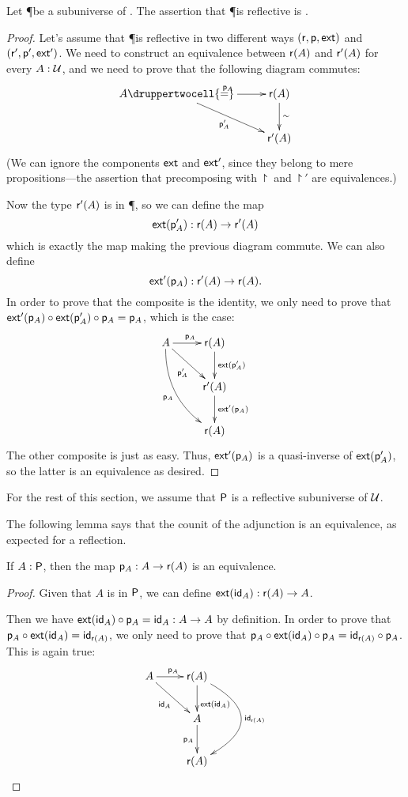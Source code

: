\begin{lem}
  Let \P be a subuniverse of \type. The assertion that \P is reflective is \anhprop.
\end{lem}

\begin{proof}
  Let's assume that \P is reflective in two different ways
  $(\reflect,\project,\ext)$ and $(\reflect',\project',\ext')$. We need to
  construct an equivalence between $\reflect(A)$ and $\reflect'(A)$ for every
  $A:\type$, and we need to prove that the following diagram commutes:
  \[\uppercurveobject{{ }}\lowercurveobject{{ }}\twocellhead{{ }}
  \xymatrix{A \ar^{\project_A}[r] \ar_{\project'_A}[rd] \druppertwocell{=} &
    \reflect(A) \ar@{->}^\sim[d] \\
    & \reflect'(A)}\]
  (We can ignore the components $\ext$ and $\ext'$, since they belong to mere propositions---the assertion that precomposing with $\project$ and $\project'$ are equivalences.)

  Now the type $\reflect'(A)$ is in \P, so we can define the map
  \[\ext(\project'_A):\reflect(A)\to\reflect'(A)\]
  which is exactly the map making the previous diagram commute.
  We can also define
  \[\ext'(\project_A):\reflect'(A)\to\reflect(A).\]
  In order to prove that the composite is the identity, we only need to prove
  that $\ext'(\project_A)\circ\ext(\project'_A)\circ\project_A=\project_A$,
  which is the case:
  \[\uppercurveobject{{ }}\lowercurveobject{{ }}\twocellhead{{ }}
  \xymatrix{A \ar^{\project_A}[r] \ar_{\project'_A}[rd]
    \ar@/_5mm/_{\project_A}[rdd] &
    \reflect(A) \ar@{->}^{\ext(\project'_A)}[d] \\
    & \reflect'(A) \ar@{->}^{\ext'(\project_A)}[d] \\
    & \reflect(A)}\]
  The other composite is just as easy.
  Thus, $\ext'(\project_A)$ is a quasi-inverse of $\ext(\project'_A)$, so the latter is an equivalence as desired.
\end{proof}

For the rest of this section, we assume that $\P$ is a reflective subuniverse of
$\type$.

The following lemma says that the counit of the adjunction is an equivalence, as expected for a reflection.
\begin{lem}
  \label{reflectPequiv}
  If $A:\P$, then the map $\project_A:A\to\reflect(A)$ is an equivalence.
\end{lem}
\begin{proof}
  Given that $A$ is in $\P$, we can define $\ext(\idfunc[A]):\reflect(A)\to{}A$.

  Then we have $\ext(\idfunc[A])\circ\project_A=\idfunc[A]:A\to{}A$ by
  definition.  In order to prove that
  $\project_A\circ\ext(\idfunc[A])=\idfunc[\reflect(A)]$, we only need to prove
  that $\project_A\circ\ext(\idfunc[A])\circ\project_A=
  \idfunc[\reflect(A)]\circ\project_A$.
  This is again true:
  \[\xymatrix{
    A \ar^{\project_A}[r] \ar_{\idfunc[A]}[rd] &
    \reflect(A) \ar^>>>{\ext(\idfunc[A])}[d] \ar@/^40pt/^{\idfunc[\reflect(A)]}[dd] \\
    & A \ar_{\project_A}[d] \\
    & \reflect(A)}\]
\end{proof}

